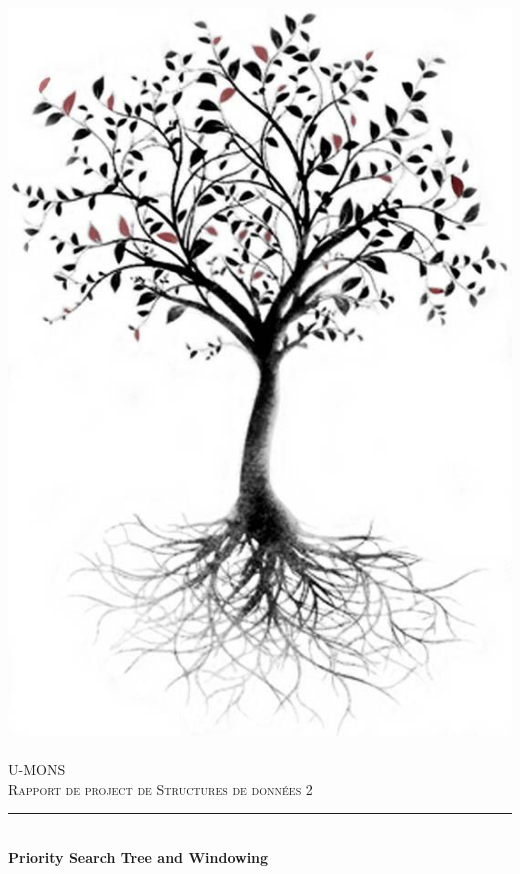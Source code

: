 \documentclass[10pt,a4paper]{article}
\newcommand{\HRule}{\rule{\linewidth}{0.5mm}}
\begin{document}
\begin{titlepage}
  \begin{sffamily}
  \begin{center}

    \includegraphics[scale=0.15]{abr.jpg}~\\[1.5cm]

    \textsc{\LARGE U-MONS}\\[2cm]

    \textsc{\Large Rapport de project de Structures de données 2}\\[1.5cm]

    \HRule \\[0.4cm]
    { \huge \bfseries Priority Search Tree and Windowing\\[0.4cm] }


\end{center}
\end{sffamily}
\end{titlepage}
\end{document}
